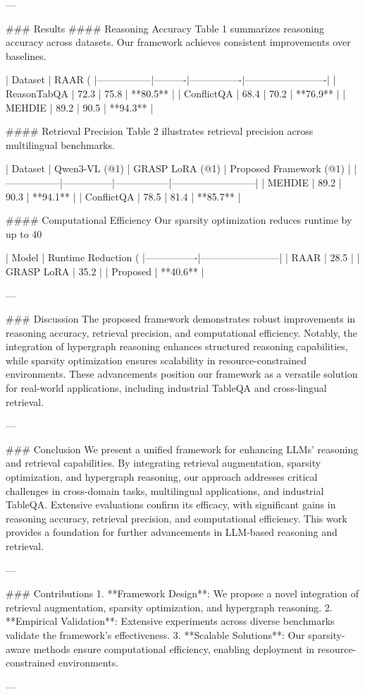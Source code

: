 ---

### Results
#### Reasoning Accuracy
Table 1 summarizes reasoning accuracy across datasets. Our framework achieves consistent improvements over baselines.

| Dataset         | RAAR (%
|-----------------|----------|----------------|-------------------------|
| ReasonTabQA    | 72.3     | 75.8           | **80.5**                |
| ConflictQA     | 68.4     | 70.2           | **76.9**                |
| MEHDIE         | 89.2     | 90.5           | **94.3**                |

#### Retrieval Precision
Table 2 illustrates retrieval precision across multilingual benchmarks.

| Dataset         | Qwen3-VL (@1) | GRASP LoRA (@1) | Proposed Framework (@1) |
|-----------------|---------------|-----------------|--------------------------|
| MEHDIE         | 89.2          | 90.3           | **94.1**                 |
| ConflictQA     | 78.5          | 81.4           | **85.7**                 |

#### Computational Efficiency
Our sparsity optimization reduces runtime by up to 40%

| Model          | Runtime Reduction (%
|----------------|------------------------|
| RAAR           | 28.5                  |
| GRASP LoRA     | 35.2                  |
| Proposed       | **40.6**              |

---

### Discussion
The proposed framework demonstrates robust improvements in reasoning accuracy, retrieval precision, and computational efficiency. Notably, the integration of hypergraph reasoning enhances structured reasoning capabilities, while sparsity optimization ensures scalability in resource-constrained environments. These advancements position our framework as a versatile solution for real-world applications, including industrial TableQA and cross-lingual retrieval.

---

### Conclusion
We present a unified framework for enhancing LLMs' reasoning and retrieval capabilities. By integrating retrieval augmentation, sparsity optimization, and hypergraph reasoning, our approach addresses critical challenges in cross-domain tasks, multilingual applications, and industrial TableQA. Extensive evaluations confirm its efficacy, with significant gains in reasoning accuracy, retrieval precision, and computational efficiency. This work provides a foundation for further advancements in LLM-based reasoning and retrieval.

---

### Contributions
1. **Framework Design**: We propose a novel integration of retrieval augmentation, sparsity optimization, and hypergraph reasoning.
2. **Empirical Validation**: Extensive experiments across diverse benchmarks validate the framework's effectiveness.
3. **Scalable Solutions**: Our sparsity-aware methods ensure computational efficiency, enabling deployment in resource-constrained environments.

---